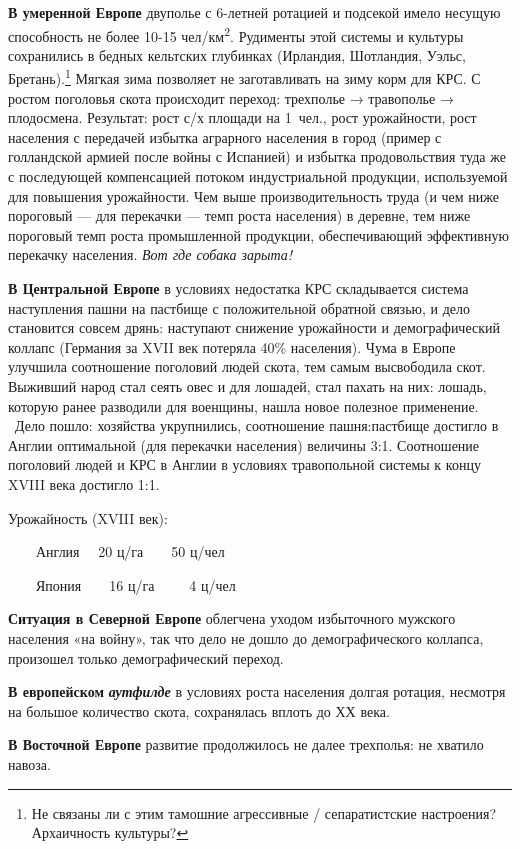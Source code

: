 \textbf{В умеренной Европе} двуполье с 6-летней ротацией и подсекой имело несущую способность не более 10-15
чел/км\textsuperscript{2}. Рудименты этой системы и культуры сохранились в бедных кельтских глубинках (Ирландия,
Шотландия, Уэльс, Бретань).\footnote{Не связаны ли с этим тамошние агрессивные / сепаратистские
настроения? Архаичность культуры?} Мягкая зима позволяет не заготавливать на зиму корм для КРС. С ростом
поголовья скота происходит переход: трехполье → травополье → плодосмена. Результат: рост с/х площади на 1~чел., рост
урожайности, рост населения с передачей избытка аграрного населения в город (пример с голландской армией после войны с
Испанией) и избытка продовольствия туда же с последующей компенсацией потоком индустриальной продукции, используемой
для повышения урожайности. Чем выше производительность труда (и чем ниже пороговый — для перекачки — темп роста
населения) в деревне, тем ниже пороговый темп роста промышленной продукции, обеспечивающий эффективную перекачку
населения. \textit{Вот где собака зарыта!}


\textbf{В Центральной Европе} в условиях недостатка КРС складывается система наступления пашни на пастбище с
положительной обратной связью, и дело становится совсем дрянь: наступают снижение урожайности и демографический коллапс
(Германия за XVII век потеряла 40\% населения). Чума в Европе улучшила соотношение поголовий людей скота, тем самым
высвободила скот. Выживший народ стал сеять овес и для лошадей, стал пахать на них: лошадь, которую ранее разводили для
военщины, нашла новое полезное применение. \ Дело пошло: хозяйства укрупнились, соотношение пашня:пастбище достигло в
Англии оптимальной (для перекачки населения) величины 3:1. Соотношение поголовий людей и КРС в Англии в условиях
травопольной системы к концу XVIII века достигло 1:1.


Урожайность (\foreignlanguage{english}{XVIII} век):


\ \ \ \ Англия \ \ 20 ц/га\ \ \ \ 50 ц/чел


\ \ \ \ Япония\ \ \ \ 16 ц/га\ \ \ \  \ 4 ц/чел


\textbf{Ситуация в Северной Европе} облегчена уходом избыточного мужского населения «на войну», так что дело не дошло до
демографического коллапса, произошел только демографический переход.


\textbf{В европейском }\textbf{\textit{аутфилде}} в условиях роста населения долгая ротация, несмотря на большое
количество скота, сохранялась вплоть до ХХ века.


\textbf{В Восточной Европе} развитие продолжилось не далее трехполья: не хватило навоза.


